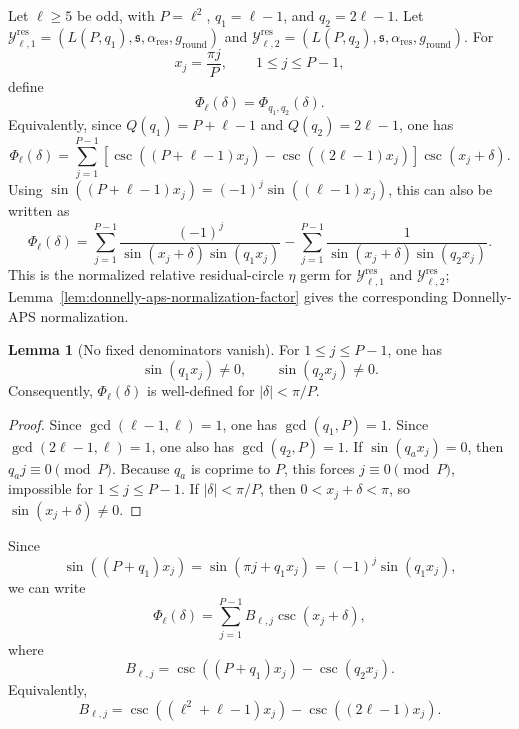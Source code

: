 \documentclass{article}
\theoremstyle{definition}
\newtheorem{lemma}[theorem]{Lemma}
\numberwithin{equation}{section}
\begin{document}
Let $\ell\geq 5$ be odd, with $P=\ell^2$, $q_1=\ell-1$, and $q_2=2\ell-1$.  Let $\mathcal Y^{\operatorname{res}}_{\ell,1}=(L(P,q_1),\mathfrak s,\alpha_{\text{res}},g_{\text{round}})$ and $\mathcal Y^{\operatorname{res}}_{\ell,2}=(L(P,q_2),\mathfrak s,\alpha_{\text{res}},g_{\text{round}})$.
For
\begin{equation}
x_j=\frac{\pi j}{P},
\qquad
1\leq j\leq P-1,
\end{equation}
define
\begin{equation}
\Phi_\ell(\delta)
=
\Phi_{q_1,q_2}(\delta).
\end{equation}
Equivalently, since $Q(q_1)=P+\ell-1$ and $Q(q_2)=2\ell-1$, one has
\begin{equation}
\Phi_\ell(\delta)
=
\sum_{j=1}^{P-1}
\left[
\csc((P+\ell-1)x_j)
-
\csc((2\ell-1)x_j)
\right]\csc(x_j+\delta).
\end{equation}
Using $\sin((P+\ell-1)x_j)=(-1)^j\sin((\ell-1)x_j)$, this can also be written as
\begin{equation}
\Phi_\ell(\delta)
=
\sum_{j=1}^{P-1}\frac{(-1)^j}{\sin(x_j+\delta)\sin(q_1x_j)}
-
\sum_{j=1}^{P-1}\frac{1}{\sin(x_j+\delta)\sin(q_2x_j)}.
\end{equation}
This is the normalized relative residual-circle $\eta$ germ for $\mathcal Y^{\operatorname{res}}_{\ell,1}$ and $\mathcal Y^{\operatorname{res}}_{\ell,2}$; Lemma~\ref{lem:donnelly-aps-normalization-factor} gives the corresponding Donnelly-APS normalization.

\begin{lemma}[No fixed denominators vanish]
\label{lem:square-family-fixed-denominators}
For $1\leq j\leq P-1$, one has
\begin{equation}
\sin(q_1x_j)\neq 0,
\qquad
\sin(q_2x_j)\neq 0.
\end{equation}
Consequently, $\Phi_\ell(\delta)$ is well-defined for $|\delta|<\pi/P$.
\end{lemma}

\begin{proof}
Since $\gcd(\ell-1,\ell)=1$, one has $\gcd(q_1,P)=1$.  Since $\gcd(2\ell-1,\ell)=1$, one also has $\gcd(q_2,P)=1$.  If $\sin(q_ax_j)=0$, then $q_aj\equiv0\pmod P$.  Because $q_a$ is coprime to $P$, this forces $j\equiv0\pmod P$, impossible for $1\leq j\leq P-1$.  If $|\delta|<\pi/P$, then $0<x_j+\delta<\pi$, so $\sin(x_j+\delta)\neq 0$.
\end{proof}

Since
\begin{equation}
\sin((P+q_1)x_j)=\sin(\pi j+q_1x_j)=(-1)^j\sin(q_1x_j),
\end{equation}
we can write
\begin{equation}
\Phi_\ell(\delta)=\sum_{j=1}^{P-1}B_{\ell,j}\csc(x_j+\delta),
\end{equation}
where
\begin{equation}
B_{\ell,j}=\csc((P+q_1)x_j)-\csc(q_2x_j).
\end{equation}
Equivalently,
\begin{equation}
B_{\ell,j}=\csc((\ell^2+\ell-1)x_j)-\csc((2\ell-1)x_j).
\end{equation}
\end{document}
